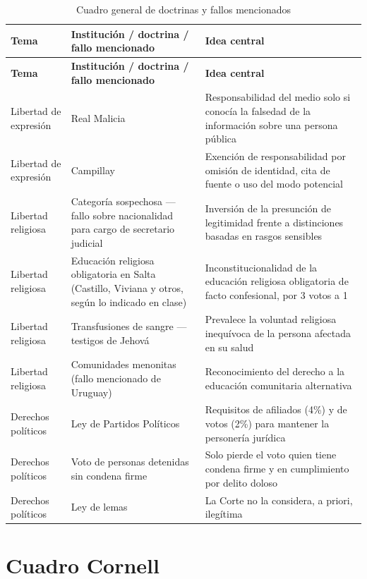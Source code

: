 \documentclass[12pt,oneside]{book}
\begin{document}
\begin{longtable}{>{\raggedright\arraybackslash}p{2.6cm}>{\raggedright\arraybackslash}p{4.2cm}>{\raggedright\arraybackslash}p{7.3cm}}
\caption{Cuadro general de doctrinas y fallos mencionados} \\
\toprule
\textbf{Tema} & \textbf{Institución / doctrina / fallo mencionado} & \textbf{Idea central} \\
\midrule
\endfirsthead
\toprule
\textbf{Tema} & \textbf{Institución / doctrina / fallo mencionado} & \textbf{Idea central} \\
\midrule
\endhead
\bottomrule
\endfoot
\bottomrule
\endlastfoot
Libertad de expresión & Real Malicia & Responsabilidad del medio solo si conocía la falsedad de la información sobre una persona pública \\
\addlinespace
Libertad de expresión & Campillay & Exención de responsabilidad por omisión de identidad, cita de fuente o uso del modo potencial \\
\addlinespace
Libertad religiosa & Categoría sospechosa --- fallo sobre nacionalidad para cargo de secretario judicial & Inversión de la presunción de legitimidad frente a distinciones basadas en rasgos sensibles \\
\addlinespace
Libertad religiosa & Educación religiosa obligatoria en Salta (Castillo, Viviana y otros, según lo indicado en clase) & Inconstitucionalidad de la educación religiosa obligatoria de facto confesional, por 3 votos a 1 \\
\addlinespace
Libertad religiosa & Transfusiones de sangre --- testigos de Jehová & Prevalece la voluntad religiosa inequívoca de la persona afectada en su salud \\
\addlinespace
Libertad religiosa & Comunidades menonitas (fallo mencionado de Uruguay) & Reconocimiento del derecho a la educación comunitaria alternativa \\
\addlinespace
Derechos políticos & Ley de Partidos Políticos & Requisitos de afiliados (4\%) y de votos (2\%) para mantener la personería jurídica \\
\addlinespace
Derechos políticos & Voto de personas detenidas sin condena firme & Solo pierde el voto quien tiene condena firme y en cumplimiento por delito doloso \\
\addlinespace
Derechos políticos & Ley de lemas & La Corte no la considera, a priori, ilegítima \\
\end{longtable}

\section{Cuadro Cornell}
\end{document}
